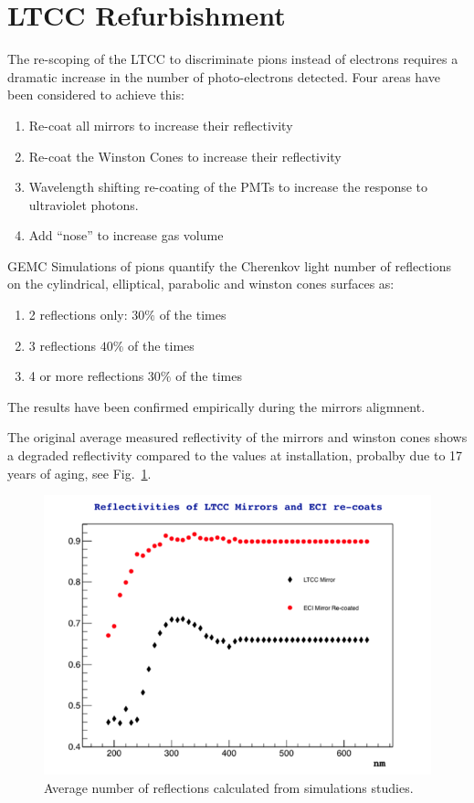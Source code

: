 \section{LTCC Refurbishment}


The re-scoping of the LTCC to discriminate pions instead of electrons requires a dramatic increase in the
number of photo-electrons detected. Four areas have been considered to achieve this:

\begin{enumerate}
	\item Re-coat all mirrors to increase their reflectivity
	\item Re-coat the Winston Cones to increase their reflectivity
	\item Wavelength shifting re-coating of the PMTs to increase the response to ultraviolet photons.
	\item Add “nose” to increase gas volume
\end{enumerate}


GEMC Simulations of pions quantify the Cherenkov light number of reflections on the cylindrical, elliptical,
parabolic and winston cones surfaces as:

\begin{enumerate}
	\item 2 reflections only: $30\%$ of the times
	\item 3 reflections $40\%$ of the times
	\item 4 or more reflections $30\%$ of the times
\end{enumerate}

The results have been confirmed empirically during the mirrors aligmnent.

The original average measured reflectivity of the mirrors and winston cones
shows a degraded reflectivity compared to the values at installation, probalby due to
17 years of aging, see Fig.~\ref{fig:reflectivityGain}.

\begin{figure}[hbt]
	\centering
	\includegraphics[width=1.0\columnwidth,keepaspectratio]{img/reflectivityGain.png}
	\caption{Average number of reflections calculated from simulations studies.}
	\label{fig:reflectivityGain}
\end{figure}

